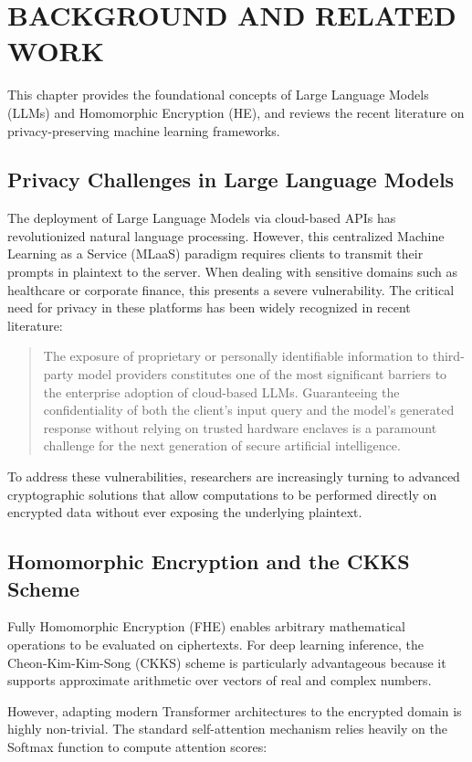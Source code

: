 \chapter{BACKGROUND AND RELATED WORK}

This chapter provides the foundational concepts of Large Language Models (LLMs) and Homomorphic Encryption (HE), and reviews the recent literature on privacy-preserving machine learning frameworks.

\section{Privacy Challenges in Large Language Models}
The deployment of Large Language Models via cloud-based APIs has revolutionized natural language processing. However, this centralized Machine Learning as a Service (MLaaS) paradigm requires clients to transmit their prompts in plaintext to the server. When dealing with sensitive domains such as healthcare or corporate finance, this presents a severe vulnerability. The critical need for privacy in these platforms has been widely recognized in recent literature:

\begin{quote}
    The exposure of proprietary or personally identifiable information to third-party model providers constitutes one of the most significant barriers to the enterprise adoption of cloud-based LLMs. Guaranteeing the confidentiality of both the client's input query and the model's generated response without relying on trusted hardware enclaves is a paramount challenge for the next generation of secure artificial intelligence.
\end{quote}

To address these vulnerabilities, researchers are increasingly turning to advanced cryptographic solutions that allow computations to be performed directly on encrypted data without ever exposing the underlying plaintext.

\section{Homomorphic Encryption and the CKKS Scheme}
Fully Homomorphic Encryption (FHE) enables arbitrary mathematical operations to be evaluated on ciphertexts. For deep learning inference, the Cheon-Kim-Kim-Song (CKKS) scheme is particularly advantageous because it supports approximate arithmetic over vectors of real and complex numbers. 

However, adapting modern Transformer architectures to the encrypted domain is highly non-trivial. The standard self-attention mechanism relies heavily on the Softmax function to compute attention scores:

